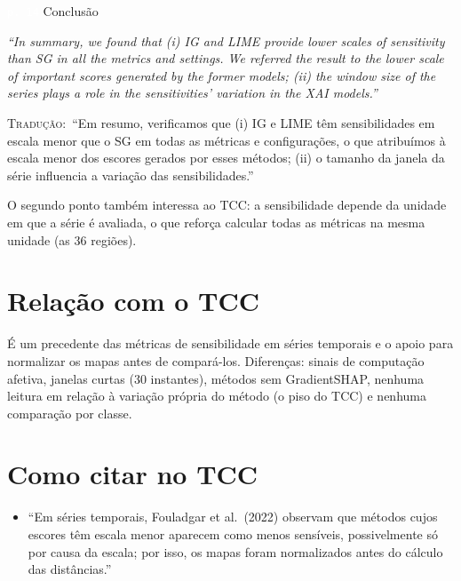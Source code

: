 \documentclass[11pt,a4paper]{article}
\newcommand{\pagechip}[1]{{\setlength{\fboxsep}{1.5pt}\colorbox{cAcc}{\textcolor{white}{\scriptsize\texttt{#1}}}}}
\newenvironment{origquote}{\par\itshape\small}{\par}
\newenvironment{tradquote}{\par\small\textsc{Tradução:}\ }{\par}
\newcommand{\explab}[1]{\par\smallskip{\small\color{cAcc}\textbf{\MakeUppercase{#1}}}\par}
\begin{document}
\begin{citacard}{\pagechip{p. 14} Conclusão}
\begin{origquote}“In summary, we found that (i) IG and LIME provide lower scales of sensitivity than SG in all the metrics and settings. We referred the result to the lower scale of important scores generated by the former models; (ii) the window size of the series plays a role in the sensitivities’ variation in the XAI models.”\end{origquote}
\begin{tradquote}“Em resumo, verificamos que (i) IG e LIME têm sensibilidades em escala menor que o SG em todas as métricas e configurações, o que atribuímos à escala menor dos escores gerados por esses métodos; (ii) o tamanho da janela da série influencia a variação das sensibilidades.”\end{tradquote}
\explab{Explicação}
O segundo ponto também interessa ao TCC: a sensibilidade depende da unidade em que a série é avaliada, o que reforça calcular todas as métricas na mesma unidade (as 36 regiões).
\end{citacard}

\section{Relação com o TCC}
É um precedente das métricas de sensibilidade em séries temporais e o apoio para normalizar os mapas antes de compará-los. Diferenças: sinais de computação afetiva, janelas curtas (30 instantes), métodos sem GradientSHAP, nenhuma leitura em relação à variação própria do método (o piso do TCC) e nenhuma comparação por classe.

\section{Como citar no TCC}
\begin{itemize}
\item ``Em séries temporais, Fouladgar et al.\ (2022) observam que métodos cujos escores têm escala menor aparecem como menos sensíveis, possivelmente só por causa da escala; por isso, os mapas foram normalizados antes do cálculo das distâncias.''
\end{itemize}
\end{document}
